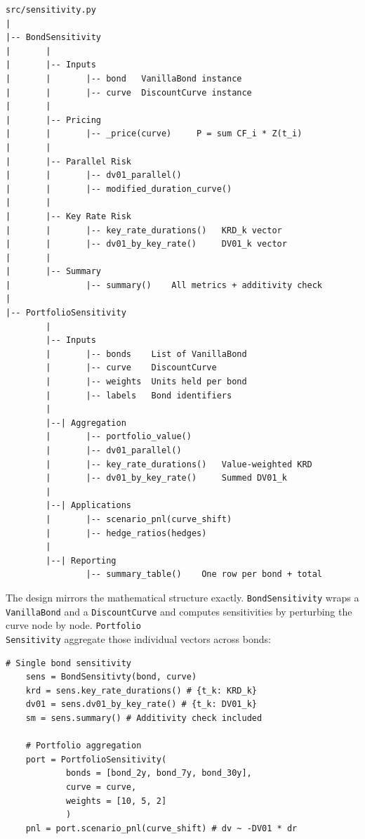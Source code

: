 \documentclass{article}
\theoremstyle{definition}  %
\theoremstyle{plain}  %
\numberwithin{definition}{section}
\numberwithin{proposition}{section}
\numberwithin{theorem}{section}
\numberwithin{equation}{section}
\begin{document}
\begin{verbatim}
src/sensitivity.py
|
|-- BondSensitivity
|       |
|       |-- Inputs
|       |       |-- bond   VanillaBond instance
|       |       |-- curve  DiscountCurve instance
|       |
|       |-- Pricing
|       |       |-- _price(curve)     P = sum CF_i * Z(t_i)
|       |
|       |-- Parallel Risk
|       |       |-- dv01_parallel()
|       |       |-- modified_duration_curve()
|       |
|       |-- Key Rate Risk
|       |       |-- key_rate_durations()   KRD_k vector
|       |       |-- dv01_by_key_rate()     DV01_k vector
|       |
|       |-- Summary
|               |-- summary()    All metrics + additivity check
|
|-- PortfolioSensitivity
        |
        |-- Inputs
        |       |-- bonds    List of VanillaBond
        |       |-- curve    DiscountCurve
        |       |-- weights  Units held per bond
        |       |-- labels   Bond identifiers
        |
        |--| Aggregation
        |       |-- portfolio_value()
        |       |-- dv01_parallel()
        |       |-- key_rate_durations()   Value-weighted KRD
        |       |-- dv01_by_key_rate()     Summed DV01_k
        |
        |--| Applications
        |       |-- scenario_pnl(curve_shift)
        |       |-- hedge_ratios(hedges)
        |
        |--| Reporting
                |-- summary_table()    One row per bond + total
\end{verbatim}

The design mirrors the mathematical structure exactly. \color{codegreen} \texttt{BondSensitivity} \color{black} wraps a \color{codegreen} \texttt{VanillaBond} \color{black} and a \color{codegreen} \texttt{DiscountCurve} \color{black} and computes sensitivities by perturbing the curve node by node. \color{codegreen} \texttt{Portfolio\\Sensitivity} \color{black} aggregate those individual vectors across bonds:

\begin{lstlisting}[style = Pythonstyle]
    # Single bond sensitivity
    sens = BondSensitivty(bond, curve)
    krd = sens.key_rate_durations() # {t_k: KRD_k}
    dv01 = sens.dv01_by_key_rate() # {t_k: DV01_k}
    sm = sens.summary() # Additivity check included

    # Portfolio aggregation
    port = PortfolioSensitivity(
            bonds = [bond_2y, bond_7y, bond_30y],
            curve = curve,
            weights = [10, 5, 2]
            )
    pnl = port.scenario_pnl(curve_shift) # dv ~ -DV01 * dr
\end{lstlisting}
\end{document}
